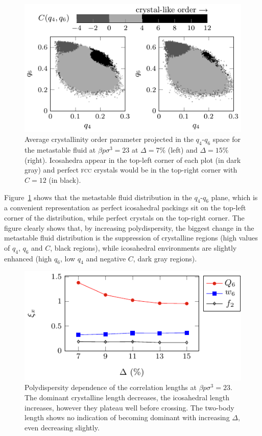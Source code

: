 \documentclass[twocolumn,superscriptaddress]{revtex4}
\begin{document}
\begin{figure}
 \centering
 \includegraphics{fig_Cmaps}
 \caption{Average crystallinity order parameter projected in the $q_4$-$q_6$ space for the metastable fluid at $\beta p\sigma^3=23$ at $\Delta=7\%$ (left) and $\Delta=15\%$ (right). Icosahedra appear in the top-left corner of each plot (in dark gray) and perfect \textsc{fcc} crystals would be in the top-right corner with $C=12$ (in black).}
 \label{fig:Cmaps}
\end{figure}


Figure~\ref{fig:Cmaps} shows that the metastable fluid distribution in the $q_4$-$q_6$ plane, which is a convenient
representation as perfect icosahedral packings sit on the top-left corner of the distribution, while perfect crystals on
the top-right corner. The figure clearly shows that, by increasing polydispersity, the biggest change in the metastable fluid
distribution is the suppression of crystalline regions (high values of
$q_4$, $q_6$ and $C$, black regions), while icosahedral environments are slightly enhanced (high $q_6$, low $q_4$ and negative $C$, dark gray regions).



\begin{figure}
 \centering
 \includegraphics{fig_lengthpoly}
	\caption{Polydispersity dependence of the correlation lengths at $\beta p\sigma^3=23$. The dominant crystalline length decreases, the icosahedral length increases, however they plateau well before crossing. The two-body length shows no indication of becoming dominant with increasing $\Delta$, even decreasing slightly.}
	\label{fig:lengthpoly}
\end{figure}
\end{document}
